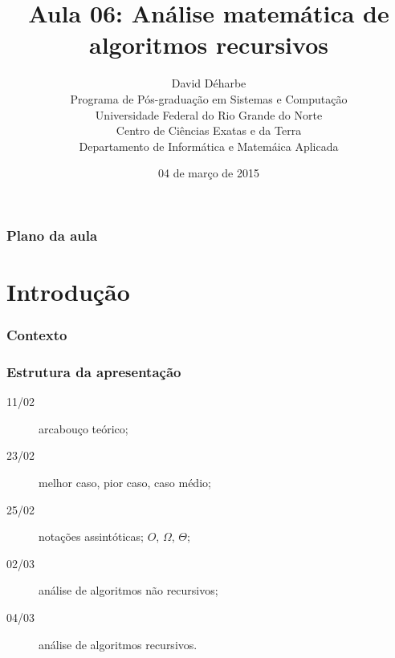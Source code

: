 \documentclass[handout]{beamer}
\title{Aula 06: Análise matemática de algoritmos recursivos}
\author{David Déharbe \\
  Programa de Pós-graduação em Sistemas e Computação \\
  Universidade Federal do Rio Grande do Norte \\
  Centro de Ciências Exatas e da Terra \\
  Departamento de Informática e Matemáica Aplicada}
\date{04 de março de 2015}
\begin{document}
\begin{frame}
  \titlepage
\end{frame}

\begin{frame}
  \frametitle{Plano da aula}
  \tableofcontents
\end{frame}

\section{Introdução}

\begin{frame}

  \frametitle{Contexto}

  \begin{center}
  
  \end{center}
\end{frame}


\begin{frame}

  \frametitle{Estrutura da apresentação}

  \begin{description}
  \item[11/02] arcabouço teórico;
  \item[23/02] melhor caso, pior caso, caso médio;
  \item[25/02] notações assintóticas; $O$, $\Omega$, $\Theta$;
  \item[02/03] análise de algoritmos não recursivos;
  \item[04/03] \alert{análise de algoritmos recursivos}.
  \end{description}
\end{frame}
\end{document}
